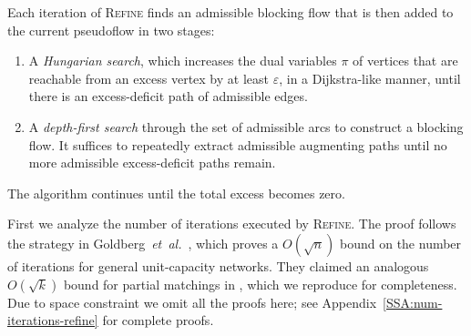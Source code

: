 \documentclass[a4paper,UKenglish]{socg-lipics-v2018}
\makeatletter
\def\etal{\emph{et~al.}}
\def\etal{\textit{et~al.}}
\def\eps{\varepsilon}
\theoremstyle{plain}
\numberwithin{figure}{section}
\def\EMPH#1{\textcolor{BrickRed}{{\emph{#1}}}}
\def\n@te#1{\textsf{\boldmath \textbf{$\langle\!\langle$#1$\rangle\!\rangle$}}\leavevmode}
\def\note#1{\textcolor{red}{\n@te{#1}}}
\renewcommand{\note}[1]{} %
\makeatother
\begin{document}
Each iteration of \textsc{Refine} finds an admissible blocking flow that is then added to the current pseudoflow in two stages:
\begin{enumerate}
\item
A \EMPH{Hungarian search}, which increases the dual variables $\pi$ of vertices that are reachable from an excess vertex by at least $\eps$, in a Dijkstra-like manner, until there is an excess-deficit path of admissible edges.
\item
A \EMPH{depth-first search} through the set of admissible arcs to construct a blocking flow.
It suffices to repeatedly extract admissible augmenting paths until no more admissible excess-deficit paths remain.
\end{enumerate}
The algorithm continues until the total excess becomes zero.

First we analyze the number of iterations executed by \textsc{Refine}.
The proof follows the strategy in Goldberg~\etal~\cite[Section~3.2]{GHKT17},
which proves a $O(\sqrt{n})$ bound on the number of iterations for general
unit-capacity networks.
They claimed an analogous $O(\sqrt{k})$ bound for partial matchings in
\cite[Section~6.1]{GHKT17}, which we reproduce for completeness.
Due to space constraint we omit all the proofs here;
see Appendix~\ref{SSA:num-iterations-refine} for complete proofs.
\end{document}
